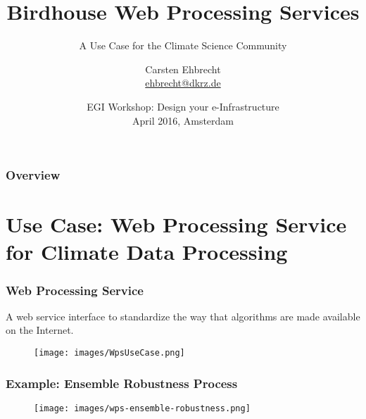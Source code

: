 \documentclass{beamer}
\title[Birdhouse]
{Birdhouse Web Processing Services}
\subtitle{A Use Case for the Climate Science Community}
\author{
Carsten Ehbrecht\\
\medskip
{\scriptsize \url{ehbrecht@dkrz.de}}
}
\institute{German Climate Computing Center (DKRZ)}
\date[April 2016]
{EGI Workshop: Design your e-Infrastructure\\
April 2016, Amsterdam}
\begin{document}

  \begin{frame}[plain]
    \titlepage
  \end{frame}


\begin{frame}
\frametitle{Overview} %
\tableofcontents %
\end{frame}


  \section{Use Case: Web Processing Service for Climate Data Processing}


  \begin{frame}[plain]
    \frametitle{Web Processing Service}
    A web service interface to standardize the way that algorithms are made available on the Internet.
    \begin{figure}
      \texttt{[image: images/WpsUseCase.png]}
    \end{figure}
    \setcounter{framenumber}{1}
  \end{frame}


  \begin{frame}[plain]
    \frametitle{Example: Ensemble Robustness Process}
    \begin{figure}
      \texttt{[image: images/wps-ensemble-robustness.png]}
    \end{figure}
   \end{frame}
\end{document}
